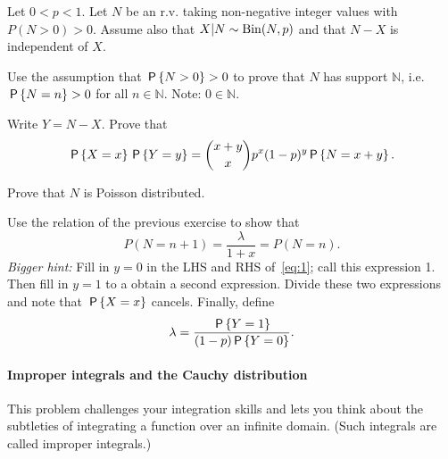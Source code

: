 \documentclass[assignments]{subfiles}
\begin{document}
Let $0 < p < 1$. Let $N$ be an r.v. taking non-negative integer values with $P(N > 0) > 0$.
Assume also that  $X|N\sim\Bin{N,p}$ and that $N-X$ is independent of $X$.

\begin{exercise}
 Use the assumption that $\P{N>0}>0$ to prove that $N$ has support $\mathbb N$, i.e. $\P{N=n} > 0$ for all $n \in \mathbb N$. Note: $0 \in \mathbb N$.
\begin{solution}
\end{solution}
\end{exercise}

\begin{exercise}
Write $Y = N-X$. Prove that
\begin{equation}
\label{eq:1}
\P{X=x}\P{Y=y} = {x+y \choose x} p^x (1-p)^y \P{N=x+y}.
\end{equation}
\begin{solution}
\end{solution}
\end{exercise}


\begin{exercise}
Prove that $N$ is Poisson distributed.
\begin{hint}
Use the relation of the previous exercise to show that
\begin{equation}
  \label{eq:3}
P(N=n+1) = \frac{\lambda}{1+x} = P(N=n).
\end{equation}
\textit{Bigger hint:} Fill in $y=0$ in the LHS and RHS of~\cref{eq:1}; call this expression 1. Then fill in $y=1$ to a obtain a second expression. Divide these two expressions and note that $\P{X=x}$ cancels. Finally,  define
\begin{equation}
\label{eq:2}
\lambda = \frac{\P{Y=1}}{(1-p)\P{Y=0}}.
\end{equation}
\end{hint}
\begin{solution}
\end{solution}
\end{exercise}



\paragraph{Improper integrals and the Cauchy distribution}

This problem challenges your integration skills and lets you think about the subtleties of integrating a function over an infinite domain.
(Such integrals are called improper integrals.)
\end{document}
